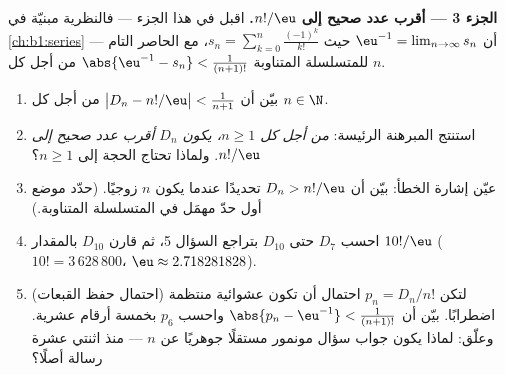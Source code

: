 \begin{problem}
\medskip
\noindent\textbf{الجزء 3 --- أقرب عدد صحيح إلى
$n!/\eu$.} اقبل في هذا الجزء --- فالنظرية مبنيّة في
\cref{ch:b1:series} --- أن
$\eu^{-1} = \lim_{n \to \infty} s_n$ حيث $s_n = \sum_{k=0}^{n}
\frac{(-1)^k}{k!}$، مع الحاصر التام للمتسلسلة المتناوبة
$\abs{\eu^{-1} - s_n} < \frac1{(n+1)!}$ من أجل كل $n$.
\begin{enumerate}[resume]
  \item بيّن أن $\bigl| D_n - n!/\eu \bigr| < \frac1{n+1}$ من أجل
        كل $n \in \N$.
  \item استنتج المبرهنة الرئيسة: \emph{من أجل كل $n \geq 1$،
        يكون $D_n$ أقرب عدد صحيح إلى $n!/\eu$}. ولماذا تحتاج
        الحجة إلى $n \geq 1$؟
  \item عيّن إشارة الخطأ: بيّن أن $D_n > n!/\eu$ تحديدًا عندما
        يكون $n$ زوجيًا. (حدّد موضع أول حدّ مهمَل في المتسلسلة
        المتناوبة.)
  \item احسب $D_7$ حتى $D_{10}$ بتراجع
        السؤال 5، ثم قارن $D_{10}$ بالمقدار $10!/\eu$
        ($10! = 3\,628\,800$، $\eu \approx 2.718281828$).
  \item (احتمال حفظ القبعات) لتكن $p_n = D_n/n!$ احتمال أن تكون
         عشوائية منتظمة اضطرابًا. بيّن أن $\abs{p_n - \eu^{-1}} < \frac1{(n+1)!}$
        واحسب $p_6$ بخمسة أرقام عشرية. وعلّق: لماذا يكون جواب
        سؤال مونمور مستقلًا جوهريًا عن $n$ --- منذ اثنتي عشرة
        رسالة أصلًا؟
\end{enumerate}


\end{problem}
